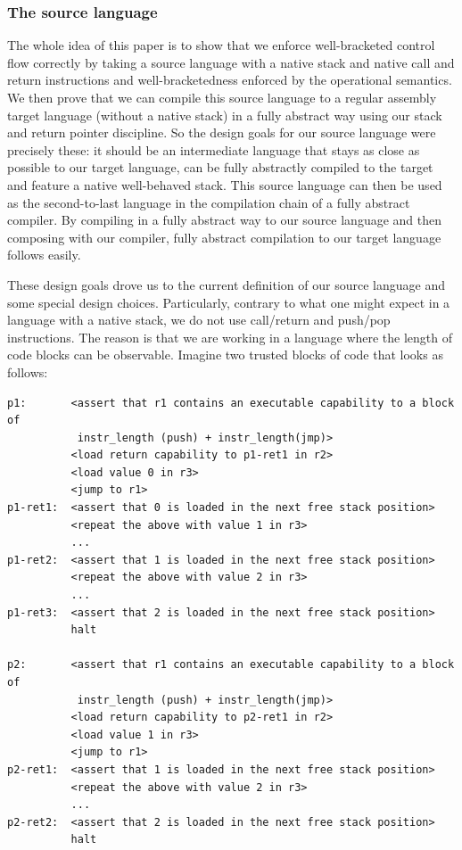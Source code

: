 \documentclass[a3paper]{article}
\newcommand{\sourcecolor}{\color{blue}}
\begin{document}
\subsubsection{The source language}
The whole idea of this paper is to show that we enforce well-bracketed control flow correctly by taking a source language with a native stack and native call and return instructions and well-bracketedness enforced by the operational semantics.
We then prove that we can compile this source language to a regular assembly target language (without a native stack) in a fully abstract way using our stack and return pointer discipline.
So the design goals for our source language were precisely these: it should be an intermediate language that stays as close as possible to our target language, can be fully abstractly compiled to the target and feature a native well-behaved stack.
This source language can then be used as the second-to-last language in the compilation chain of a fully abstract compiler.
By compiling in a fully abstract way to our source language and then composing with our compiler, fully abstract compilation to our target language follows easily.

These design goals drove us to the current definition of our source language and some special design choices.
Particularly, contrary to what one might expect in a language with a native stack, we do not use call/return and push/pop instructions.
The reason is that we are working in a language where the length of code blocks can be observable.
Imagine two trusted blocks of code that looks as follows:
\begin{lstlisting}[basicstyle=\sourcecolor{}\ttfamily] 
p1:       <assert that r1 contains an executable capability to a block of 
           instr_length (push) + instr_length(jmp)> 
          <load return capability to p1-ret1 in r2>
          <load value 0 in r3>
          <jump to r1>
p1-ret1:  <assert that 0 is loaded in the next free stack position>
          <repeat the above with value 1 in r3>
          ...
p1-ret2:  <assert that 1 is loaded in the next free stack position>
          <repeat the above with value 2 in r3>
          ...
p1-ret3:  <assert that 2 is loaded in the next free stack position>
          halt

p2:       <assert that r1 contains an executable capability to a block of 
           instr_length (push) + instr_length(jmp)>
          <load return capability to p2-ret1 in r2>
          <load value 1 in r3>
          <jump to r1>
p2-ret1:  <assert that 1 is loaded in the next free stack position>
          <repeat the above with value 2 in r3>
          ...
p2-ret2:  <assert that 2 is loaded in the next free stack position>
          halt
\end{lstlisting}
\end{document}
